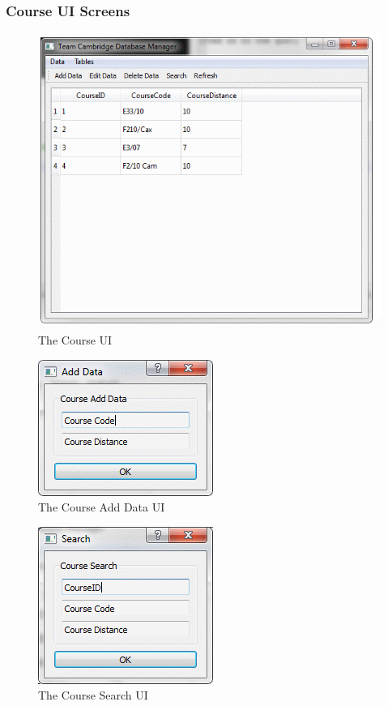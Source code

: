 \subsubsection{Course UI Screens}

\begin{figure}[H]
\includegraphics{./Maintenance/UI/Course.png}
\caption{The Course UI} \label{fig:Course_UI}
\end{figure}

\begin{figure}[H]
\includegraphics{./Maintenance/UI/CourseAD.png}
\caption{The Course Add Data UI} \label{fig:CourseAD_UI}
\end{figure}

\begin{figure}[H]
\includegraphics{./Maintenance/UI/CourseSearch.png}
\caption{The Course Search UI} \label{fig:CourseSearch_UI}
\end{figure}


